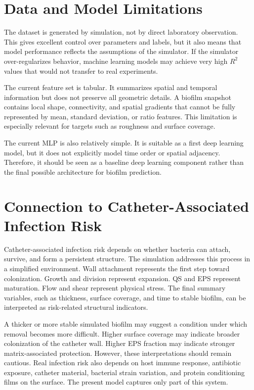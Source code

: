 \documentclass[12pt,a4paper,oneside]{report}
\begin{document}
\section{Data and Model Limitations}
The dataset is generated by simulation, not by direct laboratory observation. This gives excellent control over parameters and labels, but it also means that model performance reflects the assumptions of the simulator. If the simulator over-regularizes behavior, machine learning models may achieve very high \(R^2\) values that would not transfer to real experiments.

The current feature set is tabular. It summarizes spatial and temporal information but does not preserve all geometric details. A biofilm snapshot contains local shape, connectivity, and spatial gradients that cannot be fully represented by mean, standard deviation, or ratio features. This limitation is especially relevant for targets such as roughness and surface coverage.

The current MLP is also relatively simple. It is suitable as a first deep learning model, but it does not explicitly model time order or spatial adjacency. Therefore, it should be seen as a baseline deep learning component rather than the final possible architecture for biofilm prediction.


\section{Connection to Catheter-Associated Infection Risk}
Catheter-associated infection risk depends on whether bacteria can attach, survive, and form a persistent structure. The simulation addresses this process in a simplified environment. Wall attachment represents the first step toward colonization. Growth and division represent expansion. QS and EPS represent maturation. Flow and shear represent physical stress. The final summary variables, such as thickness, surface coverage, and time to stable biofilm, can be interpreted as risk-related structural indicators.

A thicker or more stable simulated biofilm may suggest a condition under which removal becomes more difficult. Higher surface coverage may indicate broader colonization of the catheter wall. Higher EPS fraction may indicate stronger matrix-associated protection. However, these interpretations should remain cautious. Real infection risk also depends on host immune response, antibiotic exposure, catheter material, bacterial strain variation, and protein conditioning films on the surface. The present model captures only part of this system.
\end{document}
